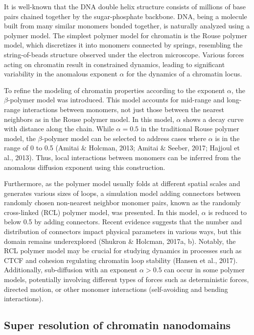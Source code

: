 It is well-known that the DNA double helix structure consists of millions of base pairs chained together by the sugar-phosphate backbone. DNA, being a molecule built from many similar monomers bonded together, is naturally analyzed using a polymer model. The simplest polymer model for chromatin is the Rouse polymer model, which discretizes it into monomers connected by springs, resembling the string-of-beads structure observed under the electron microscope. Various forces acting on chromatin result in constrained dynamics, leading to significant variability in the anomalous exponent $\alpha$ for the dynamics of a chromatin locus.

To refine the modeling of chromatin properties according to the exponent $\alpha$, the $\beta$-polymer model was introduced. This model accounts for mid-range and long-range interactions between monomers, not just those between the nearest neighbors as in the Rouse polymer model. In this model, $\alpha$ shows a decay curve with distance along the chain. While $\alpha = 0.5$ in the traditional Rouse polymer model, the $\beta$-polymer model can be selected to address cases where $\alpha$ is in the range of 0 to 0.5 (Amitai \& Holcman, 2013; Amitai \& Seeber, 2017; Hajjoul et al., 2013). Thus, local interactions between monomers can be inferred from the anomalous diffusion exponent using this construction.

Furthermore, as the polymer model usually folds at different spatial scales and generates various sizes of loops, a simulation model adding connectors between randomly chosen non-nearest neighbor monomer pairs, known as the randomly cross-linked (RCL) polymer model, was presented. In this model, $\alpha$ is reduced to below 0.5 by adding connectors. Recent evidence suggests that the number and distribution of connectors impact physical parameters in various ways, but this domain remains underexplored (Shukron \& Holcman, 2017a, b). Notably, the RCL polymer model may be crucial for studying dynamics in processes such as CTCF and cohesion regulating chromatin loop stability (Hansen et al., 2017). Additionally, sub-diffusion with an exponent $\alpha > 0.5$ can occur in some polymer models, potentially involving different types of forces such as deterministic forces, directed motion, or other monomer interactions (self-avoiding and bending interactions).


\subsection{Super resolution of chromatin nanodomains}

